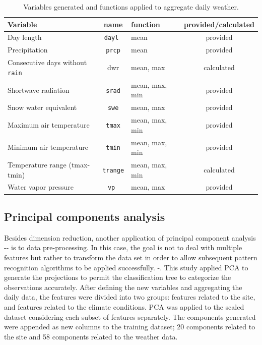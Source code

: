 \documentclass[syngen,nonblindrev]{informs3-syngen}
\begin{document}
\begin{table}
\begin{center}
\begin{tabular}{lclc}
\hline
Variable   & name & function & provided/calculated   \\
\hline

Day length	& \texttt{dayl }& mean & provided\\
Precipitation & \texttt{prcp} & mean & provided \\
Consecutive days without \texttt{rain} & dwr & mean, max & calculated \\
Shortwave radiation	&\texttt{srad} & mean, max, min& provided\\
Snow water equivalent	& \texttt{swe} & mean, max& provided\\
Maximum air temperature	& \texttt{tmax} & mean, max, min& provided\\
Minimum air temperature	& \texttt{tmin} & mean, max, min& provided\\
Temperature range (tmax-tmin) & \texttt{trange}& mean, max, min & calculated\\
Water vapor pressure	&\texttt{vp }& mean, max& provided\\
\hline
\end{tabular}
\end{center}
\caption{Variables generated and functions applied to aggregate daily weather.}\label{agg}
\end{table}

\subsection{Principal components analysis}

Besides dimension reduction, another application of principal component analysis -\cite{hotelling1933analysis}- is to data pre-processing. 
In this case, the goal is not to deal with multiple features but rather to transform the data set in order to allow subsequent pattern recognition algorithms to be applied successfully. -\cite{bishop2006pattern}.
This study applied PCA to generate the projections to permit the classification tree to categorize the observations accurately. 
After defining the new variables and aggregating the daily data, the features were divided into two groups: features related to the site, and features related to the climate conditions. 
PCA was applied to the scaled dataset considering each subset of features separately.
The components generated were appended as new columns to the training dataset; 20 components related to the site and 58 components related to the weather data. 
\end{document}
